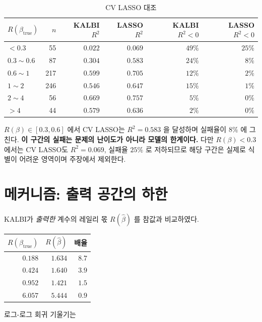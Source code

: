 \documentclass[11pt]{article}
\newcommand{\Rq}{R(\beta)}
\newcommand{\bhat}{\hat{\beta}}
\begin{document}
\begin{table}[h]
\centering
\caption{CV LASSO 대조}
\begin{tabular}{@{}lrrrrr@{}}
\toprule
$R(\beta_{\mathrm{true}})$ & $n$ & KALBI $R^2$ & LASSO $R^2$
 & KALBI $R^2<0$ & LASSO $R^2<0$ \\
\midrule
$< 0.3$        &  55 & $0.022$ & $0.069$ & $49\%$ & $25\%$ \\
$0.3 \sim 0.6$ &  87 & $0.304$ & $0.583$ & $24\%$ & $\phantom{0}8\%$ \\
$0.6 \sim 1$   & 217 & $0.599$ & $0.705$ & $12\%$ & $\phantom{0}2\%$ \\
$1 \sim 2$     & 246 & $0.546$ & $0.647$ & $15\%$ & $\phantom{0}1\%$ \\
$2 \sim 4$     &  56 & $0.669$ & $0.757$ & $\phantom{0}5\%$ & $\phantom{0}0\%$ \\
$> 4$          &  44 & $0.579$ & $0.636$ & $\phantom{0}2\%$ & $\phantom{0}0\%$ \\
\bottomrule
\end{tabular}
\end{table}

$\Rq \in [0.3, 0.6]$ 에서 CV LASSO는 $R^2 = 0.583$ 을 달성하며 실패율이 $8\%$ 에
그친다. \textbf{이 구간의 실패는 문제의 난이도가 아니라 모델의 한계이다.}
다만 $\Rq < 0.3$ 에서는 CV LASSO도 $R^2 = 0.069$, 실패율 $25\%$ 로 저하되므로
해당 구간은 실제로 식별이 어려운 영역이며 주장에서 제외한다.

\section{메커니즘: 출력 공간의 하한}

KALBI가 \emph{출력한} 계수의 레일리 몫 $R(\bhat)$ 를 참값과 비교하였다.

\begin{table}[h]
\centering
\begin{tabular}{@{}rrr@{}}
\toprule
$R(\beta_{\mathrm{true}})$ & $R(\bhat)$ & 배율 \\
\midrule
$0.188$ & $1.634$ & $8.7$ \\
$0.424$ & $1.640$ & $3.9$ \\
$0.952$ & $1.421$ & $1.5$ \\
$6.057$ & $5.444$ & $0.9$ \\
\bottomrule
\end{tabular}
\end{table}

로그-로그 회귀 기울기는
\end{document}
